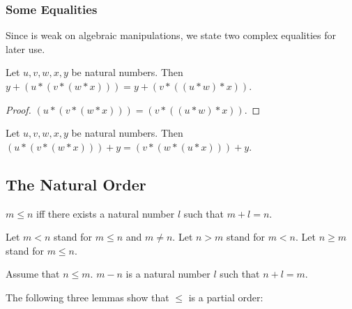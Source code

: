\documentclass[11pt]{article}
\begin{document}
\subsubsection{Some Equalities}

Since \Naproche{} is weak on algebraic manipulations, we 
state two complex equalities for later use.

\begin{forthel}

\begin{lemma}
Let $u,v,w,x,y$ be natural numbers. 
Then $y + (u * (v * (w * x))) = y + (v * ((u * w) * x))$.
\end{lemma}
\begin{proof}
$(u * (v * (w * x))) = (v * ((u * w) * x))$.
\end{proof}

\begin{lemma}
Let $u,v,w,x,y$ be natural numbers. Then  $(u * (v * (w * x))) + y = (v * (w * (u * x))) + y$.
\end{lemma}


\end{forthel}


\subsection{The Natural Order}

\begin{forthel}

\begin{definition}
$m \leq n$ iff
there exists a natural number $l$ such that $m + l = n$.
\end{definition}

Let $m < n$ stand for $m \leq n$ and $m \neq n$.
Let $n > m$ stand for $m < n$.
Let $n \geq m$ stand for $m \leq n$.


\begin{definition}
Assume that $n \leq m$.
$m - n$ is a natural number $l$ such that $n + l  = m$.
\end{definition}

\end{forthel}

The following three lemmas show that $\leq$ is a partial order:
\end{document}

